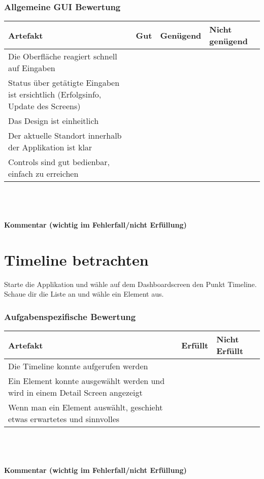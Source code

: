 \documentclass[10pt,a4paper]{scrartcl}
\begin{document}
\subsubsection*{Allgemeine GUI Bewertung}
\begin{tabular}{|p{}|p{}|p{}|p{}|}
\hline 
\rule[-1ex]{0pt}{2.5ex} \textbf{Artefakt} & \textbf{Gut} & \textbf{Genügend} & \textbf{Nicht genügend} \\ 
\hline 
\rule[-1ex]{0pt}{2.5ex} Die Oberfläche reagiert schnell auf Eingaben &  &  &  \\ 
\hline 
\rule[-1ex]{0pt}{2.5ex} Status über getätigte Eingaben ist ersichtlich (Erfolgsinfo, Update des Screens) &  &  &  \\ 
\hline 
\rule[-1ex]{0pt}{2.5ex} Das Design ist einheitlich &  &  &  \\ 
\hline 
\rule[-1ex]{0pt}{2.5ex} Der aktuelle Standort innerhalb der Applikation ist klar &  &  &  \\ 
\hline 
\rule[-1ex]{0pt}{2.5ex} Controls sind gut bedienbar, einfach zu erreichen &  &  &  \\  
\hline 
\end{tabular} 
\\
\\
\\
\textbf{Kommentar (wichtig im Fehlerfall/nicht Erfüllung)}
\vspace*{3cm}


\section{Timeline betrachten}
Starte die Applikation und wähle auf dem Dashboardscreen den Punkt Timeline. Schaue dir die Liste an
und wähle ein Element aus.

\subsubsection*{Aufgabenspezifische Bewertung}
\begin{tabular}{|p{}|p{}|p{}|}
\hline 
\textbf{Artefakt} & \textbf{Erfüllt} & \textbf{Nicht Erfüllt} \\ 
\hline 
Die Timeline konnte aufgerufen werden &  &  \\ 
\hline 
Ein Element konnte ausgewählt werden und wird in einem Detail Screen angezeigt &  &  \\ 
\hline 
Wenn man ein Element auswählt, geschieht etwas erwartetes und sinnvolles &  &  \\ 
\hline 
\end{tabular}
\\
\\
\\
\textbf{Kommentar (wichtig im Fehlerfall/nicht Erfüllung)}
\vspace*{3cm}
\end{document}
